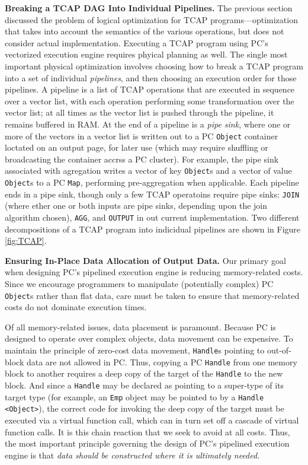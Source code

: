 \vspace{5 pt}
\noindent
\textbf{Breaking a TCAP DAG Into Individual Pipelines.}
The previous section discussed the problem of logical optimization for TCAP programs---optimization that takes into account the semantics
of the various operations, but does not consider actual implementation.  
Executing a TCAP program using PC's vectorized execution engine requires phyical planning as well.  The single most important physical 
optimization involves choosing how to break a TCAP program into a set of individual \emph{pipelines}, and then choosing an execution order
for those pipelines.
A pipeline is a list of TCAP operations that are executed in sequence over a vector list, with each operation performing some
transformation over the vector list; at all times as the vector list is pushed through the pipeline, it remains buffered in RAM.  
At the end of a pipeline is a \emph{pipe sink}, where one or more of the
vectors in a vector list is written out to a PC \texttt{Object}
container loctated on an output page, for later use (which may require shuffling or broadcasting the container accrss a PC cluster).  
For example, the pipe sink associated with agregation
writes a vector of key \texttt{Object}s and a vector of value \texttt{Object}s to a PC \texttt{Map}, performing pre-aggregation when
applicable.
Each pipeline ends in a pipe sink, though only a few TCAP operatoins require pipe sinks: \texttt{JOIN} (where ether one or both inputs are pipe
sinks, depending upon the join algorithm chosen), \texttt{AGG}, and \texttt{OUTPUT} in out current implementation. 
Two different decompositions of a TCAP program into indicidual pipelines are shown in Figure \ref{fig:TCAP}.



\vspace{5 pt}
\noindent
\textbf{Ensuring In-Place Data Allocation of Output Data.}
Our primary goal when designing PC's pipelined execution engine is reducing  
memory-related costs.  
Since we 
encourage programmers to manipulate (potentially complex) PC \texttt{Object}s
rather than flat data, care must be taken to ensure that memory-related costs do
not dominate execution times.

Of all memory-related issues,  
data placement is paramount.  Because PC is designed to operate over
complex objects, data movement can be 
expensive.  To maintain the principle of
zero-cost data movement, \texttt{Handle}s pointing to out-of-block data are not allowed in PC.
Thus, copying a PC \texttt{Handle} from one memory block to another requires a deep copy of the target of the \texttt{Handle} to the new block.  
And since a
\texttt{Handle} may be declared as pointing to a super-type of its
target type (for example, an \texttt{Emp} object may be pointed to by a \texttt{Handle <Object>}), the correct code for invoking the deep copy of the
target must be executed via a virtual 
function call, which can in turn set off a cascade of virtual function calls. It is this chain reaction that we seek to avoid at all costs.
Thus, the most important principle governing the 
design of PC's pipelined execution engine is that \emph{data should be constructed where it is ultimately needed}.

